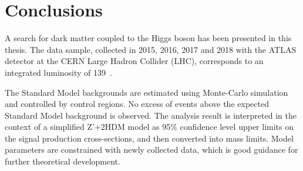 \chapter{Conclusions}

\label{ch:con}

\par A search for dark matter coupled to the Higgs boson has been presented in this thesis. 
The data sample, collected in 2015, 2016, 2017 and 2018 with the ATLAS detector at the CERN Large Hadron Collider (LHC), corresponds to an integrated luminosity of 139~\ifb. 

\par The Standard Model backgrounds are estimated using Monte-Carlo simulation and controlled by control regions. 
No excess of events above the expected Standard Model background is observed. 
The analysis result is interpreted in the context of a simplified Z'+2HDM model as 95\% confidence level upper limits on the signal production cross-sections, and then converted into mass limits. 
Model parameters are constrained with newly collected data, which is good guidance for further theoretical development.
